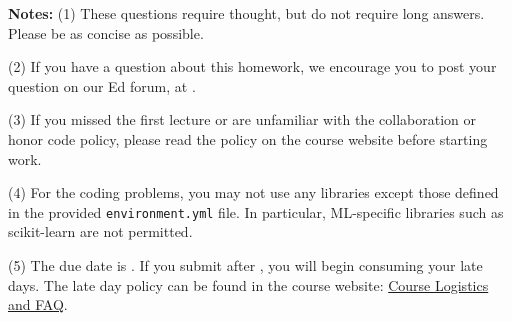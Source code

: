 {\bf Notes:} 
(1) These questions require thought, but do not require long
answers. Please be as concise as possible.  

(2) If you have a question
about this homework, we encourage you to post your question on our
Ed forum, at \edstem. 

(3) If you
missed the first lecture or are unfamiliar with the collaboration or honor
code policy, please read the policy on the course website before starting work.

(4) For the coding problems, you may not
use any libraries except those defined in the provided \texttt{environment.yml}
file. In particular, ML-specific libraries such as scikit-learn are not
permitted. 

(5) The due date is \due. If you submit after
\due, you will begin consuming your
late days. The late day policy can be found in the course website:  \href{https://docs.google.com/document/d/1PbQxBQTpp4K5hTzOJB9r8etKgsAuNPWs/edit#heading=h.gjdgxs}{Course Logistics and FAQ}.

